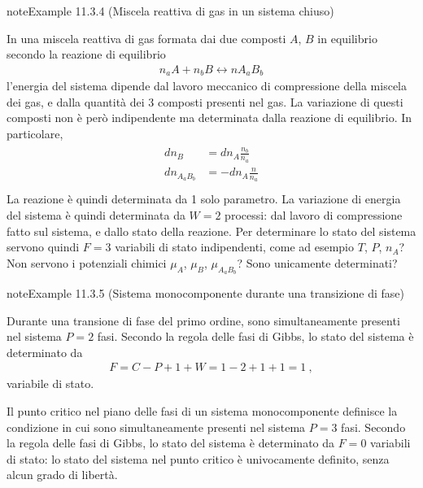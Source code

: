 \documentclass[letterpaper,10pt,italian]{jupyterBook}
\begin{document}
\label{ch/thermodynamics/principles-gibbs-phase-rule:example-6}
\begin{sphinxadmonition}{note}{Example 11.3.4 (Miscela reattiva di gas in un sistema chiuso)}



\sphinxAtStartPar
In una miscela reattiva di gas formata dai due composti \(A\), \(B\) in equilibrio secondo la reazione di equilibrio
\begin{equation*}
\begin{split}n_a A + n_b B \leftrightarrow n A_a B_b\end{split}
\end{equation*}
\sphinxAtStartPar
l’energia del sistema dipende dal lavoro meccanico di compressione della miscela dei gas, e dalla quantità dei 3 composti presenti nel gas. La variazione di questi composti non è però indipendente ma determinata dalla reazione di equilibrio. In particolare,
\begin{equation*}
\begin{split}\begin{aligned}
  d n_{B} & = d n_{A} \frac{n_b}{n_a} \\
  d n_{A_a B_b} & = - d n_{A} \frac{n}{n_a} \\
\end{aligned}\end{split}
\end{equation*}
\sphinxAtStartPar
La reazione è quindi determinata da 1 solo parametro. La variazione di energia del sistema è quindi determinata da \(W=2\) processi: dal lavoro di compressione fatto sul sistema, e dallo stato della reazione. Per determinare lo stato del sistema servono quindi \(F=3\) variabili di stato indipendenti, come ad esempio  \(T\), \(P\), \(n_A\)? Non servono i potenziali chimici \(\mu_A\), \(\mu_B\), \(\mu_{A_a B_b}\)? Sono unicamente determinati?
\end{sphinxadmonition}
\label{ch/thermodynamics/principles-gibbs-phase-rule:example-7}
\begin{sphinxadmonition}{note}{Example 11.3.5 (Sistema monocomponente durante una transizione di fase)}



\sphinxAtStartPar
{} Durante una transione di fase del primo ordine, sono simultaneamente presenti nel sistema \(P = 2\) fasi. Secondo la regola delle fasi di Gibbs, lo stato del sistema è determinato da
\begin{equation*}
\begin{split}F = C - P + 1 + W = 1 - 2 + 1 + 1 = 1 \ ,\end{split}
\end{equation*}
\sphinxAtStartPar
variabile di stato.

\sphinxAtStartPar
{} Il punto critico nel piano delle fasi di un sistema mono\sphinxhyphen{}componente definisce la condizione in cui sono simultaneamente presenti nel sistema \(P = 3\) fasi. Secondo la regola delle fasi di Gibbs, lo stato del sistema è determinato da \(F = 0\) variabili di stato: lo stato del sistema nel punto critico è univocamente definito, senza alcun grado di libertà.
\end{sphinxadmonition}
\end{document}
